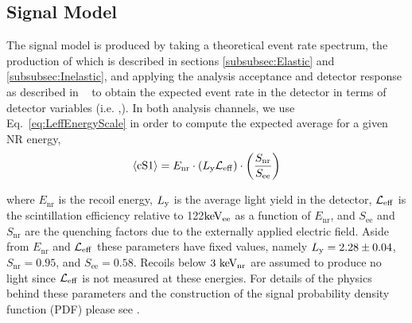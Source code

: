 \subsection{Signal Model}
\label{subsec:SignalModel}
The signal model is produced by taking a theoretical event rate spectrum, the production of which is described in sections \ref{subsubsec:Elastic} and \ref{subsubsec:Inelastic}, and applying the analysis acceptance and detector response as described in ~\cite{Aprile:2012vw}  to obtain the expected event rate in the detector in terms of detector variables (i.e. \cSi,\cSiib). 
In both analysis channels, we use Eq.~\ref{eq:LeffEnergyScale} in order to compute the expected average \cSi for a given NR energy,
\begin{equation}
\label{eq:LeffEnergyScale}
	\langle \mathrm{cS1} \rangle = E_{\mathrm{nr}} \cdot (L_{\mathrm{y}} \mathcal{L}_{\mathrm{eff}}) \cdot   \left(\frac{S_\mathrm{nr}}{S_\mathrm{ee}}\right) 
\end{equation}

%
%
%
where $E_\mathrm{nr}$ is the recoil energy, $L_{\mathrm{y}}$ is the average light yield in the detector, $\mathcal{L}_{\mathrm{eff}}$ is the scintillation efficiency relative to 122$\mathrm{keV_\mathrm{ee}}$ as a function of $E_\mathrm{nr}$, and $S_\mathrm{ee}$ and $S_\mathrm{nr}$ are the quenching factors due to the externally applied electric field. Aside from $E_\mathrm{nr}$ and $\mathcal{L}_{\mathrm{eff}}$ these parameters have fixed values, namely $L_{\mathrm{y}} = 2.28 \pm 0.04$, $S_\mathrm{nr} = 0.95$, and $S_\mathrm{ee} = 0.58$. Recoils below $3~\mathrm{keV_\mathrm{nr}}$ are assumed to produce no light since $\mathcal{L}_{\mathrm{eff}}$ is not measured at these energies. For details of the physics behind these parameters and the construction of the signal probability density function (PDF) please see \cite{Aprile:2012vw,xe100_run_combination}. 

